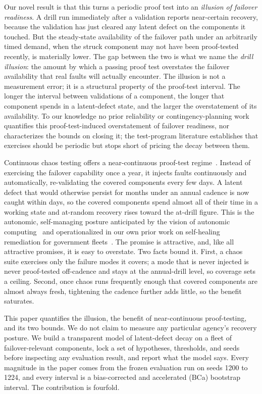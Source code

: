 \documentclass[journal]{IEEEtran}
\begin{document}
Our novel result is that this turns a periodic proof test into an \emph{illusion of failover
readiness}. A drill run immediately after a validation reports near-certain recovery, because the
validation has just cleared any latent defect on the components it touched. But the steady-state
availability of the failover path under an arbitrarily timed demand, when the struck component may
not have been proof-tested recently, is materially lower. The gap between the two is what we name the
\emph{drill illusion}: the amount by which a passing proof test overstates the failover availability
that real faults will actually encounter. The illusion is not a measurement error; it is a structural
property of the proof-test interval. The longer the interval between validations of a component, the
longer that component spends in a latent-defect state, and the larger the overstatement of its
availability. To our knowledge no prior reliability or contingency-planning work quantifies this
proof-test-induced overstatement of failover readiness, nor characterizes the bounds on closing it;
the test-program literature establishes that exercises should be periodic but stops short of pricing
the decay between them.

Continuous chaos testing offers a near-continuous proof-test regime~\cite{basiri2016chaos,beyer2016sre}.
Instead of exercising the failover capability once a year, it injects faults continuously and
automatically, re-validating the covered components every few days. A latent defect that would
otherwise persist for months under an annual cadence is now caught within days, so the covered
components spend almost all of their time in a working state and at-random recovery rises toward the
at-drill figure. This is the autonomic, self-managing posture anticipated by the vision of autonomic
computing~\cite{kephart2003vision} and operationalized in our own prior work on self-healing
remediation for government fleets~\cite{paper10autoheal}. The promise is attractive, and, like all
attractive promises, it is easy to overstate. Two facts bound it. First, a chaos suite exercises only
the failure modes it covers; a mode that is never injected is never proof-tested off-cadence and
stays at the annual-drill level, so coverage sets a ceiling. Second, once chaos runs frequently
enough that covered components are almost always fresh, tightening the cadence further adds little,
so the benefit saturates.

This paper quantifies the illusion, the benefit of near-continuous proof-testing, and its two bounds.
We do not claim to measure any particular agency's recovery posture. We build a transparent model of
latent-defect decay on a fleet of failover-relevant components, lock a set of hypotheses, thresholds,
and seeds before inspecting any evaluation result, and report what the model says. Every magnitude in
the paper comes from the frozen evaluation run on seeds 1200 to 1224, and every interval is a
bias-corrected and accelerated (BCa) bootstrap interval. The contribution is fourfold.
\end{document}
